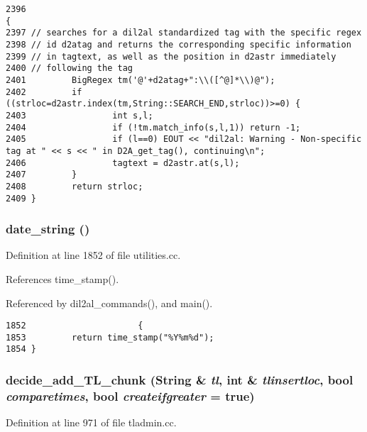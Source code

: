 \footnotesize\begin{verbatim}2396                                                                               {
2397 // searches for a dil2al standardized tag with the specific regex
2398 // id d2atag and returns the corresponding specific information
2399 // in tagtext, as well as the position in d2astr immediately
2400 // following the tag
2401         BigRegex tm('@'+d2atag+":\\([^@]*\\)@");
2402         if ((strloc=d2astr.index(tm,String::SEARCH_END,strloc))>=0) {
2403                 int s,l;
2404                 if (!tm.match_info(s,l,1)) return -1;
2405                 if (l==0) EOUT << "dil2al: Warning - Non-specific tag at " << s << " in D2A_get_tag(), continuing\n";
2406                 tagtext = d2astr.at(s,l);
2407         }
2408         return strloc;
2409 }
\end{verbatim}\normalsize 
{}
\subsubsection{ date\_\-string ()}\label{dil2al_8hh_a220}




Definition at line 1852 of file utilities.cc.

References time\_\-stamp().

Referenced by dil2al\_\-commands(), and main().



\footnotesize\begin{verbatim}1852                      {
1853         return time_stamp("%Y%m%d");
1854 }
\end{verbatim}\normalsize 
{}
\subsubsection{ decide\_\-add\_\-TL\_\-chunk ({\bf String} \& {\em tl}, int \& {\em tlinsertloc}, bool {\em comparetimes}, bool {\em createifgreater} = {\bf true})}\label{dil2al_8hh_a328}




Definition at line 971 of file tladmin.cc.

